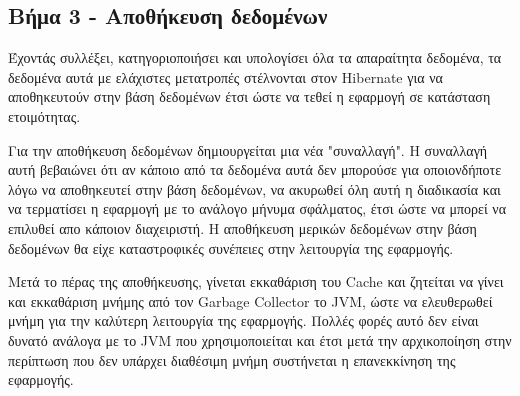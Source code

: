 \subsection{Βήμα 3 - Αποθήκευση δεδομένων}
Έχοντάς συλλέξει, κατηγοριοποιήσει και υπολογίσει όλα τα απαραίτητα δεδομένα, τα δεδομένα αυτά με ελάχιστες μετατροπές στέλνονται στον Hibernate για να αποθηκευτούν στην βάση δεδομένων έτσι ώστε να τεθεί η εφαρμογή σε κατάσταση ετοιμότητας. 

Για την αποθήκευση δεδομένων δημιουργείται μια νέα "συναλλαγή". Η συναλλαγή αυτή βεβαιώνει ότι αν κάποιο από τα δεδομένα αυτά δεν μπορούσε για οποιονδήποτε λόγω να αποθηκευτεί στην βάση δεδομένων, να ακυρωθεί όλη αυτή η διαδικασία και να τερματίσει η εφαρμογή με το ανάλογο μήνυμα σφάλματος, έτσι ώστε να μπορεί να επιλυθεί απο κάποιον διαχειριστή. Η αποθήκευση μερικών δεδομένων στην βάση δεδομένων θα είχε καταστροφικές συνέπειες στην λειτουργία της εφαρμογής. 

Μετά το πέρας της αποθήκευσης, γίνεται εκκαθάριση του Cache και ζητείται να γίνει και εκκαθάριση μνήμης από τον Garbage Collector το JVM, ώστε να ελευθερωθεί μνήμη για την καλύτερη λειτουργία της εφαρμογής. Πολλές φορές αυτό δεν είναι δυνατό ανάλογα με το JVM που χρησιμοποιείται και έτσι μετά την αρχικοποίηση στην περίπτωση που δεν υπάρχει διαθέσιμη μνήμη συστήνεται η επανεκκίνηση της εφαρμογής.

